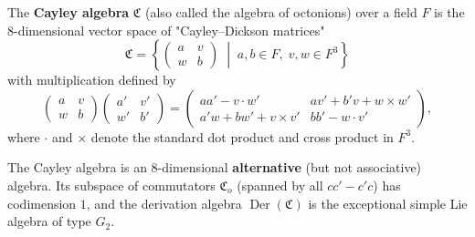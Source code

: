 The \textbf{Cayley algebra} $\mathfrak{C}$ (also called the algebra of octonions) over a field $F$ is the $8$-dimensional vector space of "Cayley–Dickson matrices"
$$\mathfrak{C} = \left\{ \begin{pmatrix} a & v \\ w & b \end{pmatrix} \;\middle|\; a, b \in F,\; v, w \in F^3 \right\}$$
with multiplication defined by
$$\begin{pmatrix} a & v \\ w & b \end{pmatrix} \begin{pmatrix} a' & v' \\ w' & b' \end{pmatrix} = \begin{pmatrix} aa' - v \cdot w' & av' + b'v + w \times w' \\ a'w + bw' + v \times v' & bb' - w \cdot v' \end{pmatrix},$$
where $\cdot$ and $\times$ denote the standard dot product and cross product in $F^3$.

The Cayley algebra is an $8$-dimensional \textbf{alternative} (but not associative) algebra. Its subspace of commutators $\mathfrak{C}_o$ (spanned by all $cc' - c'c$) has codimension $1$, and the derivation algebra $\operatorname{Der}(\mathfrak{C})$ is the exceptional simple Lie algebra of type $G_2$.
